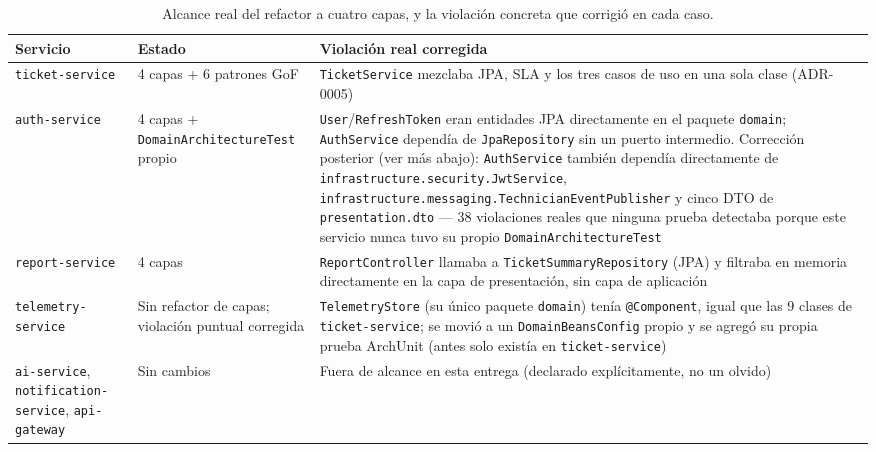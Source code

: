 \begin{table}[H]
\centering
\small
\caption{Alcance real del refactor a cuatro capas, y la violación concreta que corrigió en cada
caso.}
\label{tab:hexagonal-alcance}
\begin{tabular}{@{}p{2.9cm}p{4.6cm}p{6.0cm}@{}}
\toprule
\textbf{Servicio} & \textbf{Estado} & \textbf{Violación real corregida} \\
\midrule
\texttt{ticket-service} & 4 capas + 6 patrones GoF & \texttt{TicketService} mezclaba JPA, SLA y
  los tres casos de uso en una sola clase (ADR-0005) \\
\texttt{auth-service} & 4 capas + \texttt{DomainArchitectureTest} propio & \texttt{User}/\texttt{RefreshToken} eran entidades JPA
  directamente en el paquete \texttt{domain}; \texttt{AuthService} dependía de
  \texttt{JpaRepository} sin un puerto intermedio. Corrección posterior (ver más abajo):
  \texttt{AuthService} también dependía directamente de
  \texttt{infrastructure.security.JwtService},
  \texttt{infrastructure.messaging.TechnicianEventPublisher} y cinco DTO de
  \texttt{presentation.dto} — 38 violaciones reales que ninguna prueba detectaba porque este
  servicio nunca tuvo su propio \texttt{DomainArchitectureTest} \\
\texttt{report-service} & 4 capas & \texttt{ReportController} llamaba a
  \texttt{TicketSummaryRepository} (JPA) y filtraba en memoria directamente en la capa de
  presentación, sin capa de aplicación \\
\texttt{telemetry-service} & Sin refactor de capas; violación puntual corregida &
  \texttt{TelemetryStore} (su único paquete \texttt{domain}) tenía \texttt{@Component}, igual
  que las 9 clases de \texttt{ticket-service}; se movió a un \texttt{DomainBeansConfig} propio y
  se agregó su propia prueba ArchUnit (antes solo existía en \texttt{ticket-service}) \\
\texttt{ai-service}, \texttt{notification-service}, \texttt{api-gateway} & Sin cambios &
  Fuera de alcance en esta entrega (declarado explícitamente, no un olvido) \\
\bottomrule
\end{tabular}
\end{table}

